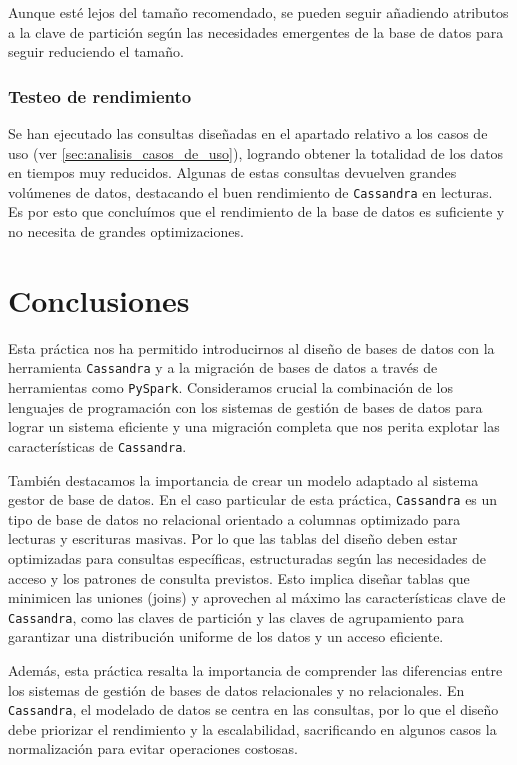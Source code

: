 \documentclass[]{article}
\begin{document}
Aunque esté lejos del tamaño recomendado, se pueden seguir añadiendo atributos
a la clave de partición según las necesidades emergentes de la base de datos
para seguir reduciendo el tamaño.

\subsubsection{Testeo de rendimiento}

Se han ejecutado las consultas diseñadas en el apartado relativo a los casos de
uso (ver \ref{sec:analisis_casos_de_uso}), logrando obtener la totalidad de los
datos en tiempos muy reducidos. Algunas de estas consultas devuelven grandes
volúmenes de datos, destacando el buen rendimiento de \verb!Cassandra! en
lecturas. Es por esto que concluímos que el rendimiento de la base de datos es
suficiente y no necesita de grandes optimizaciones.

\newpage
\section{Conclusiones}

Esta práctica nos ha permitido introducirnos al diseño de bases de datos con la
herramienta \verb!Cassandra! y a la migración de bases de datos a través de
herramientas como \verb!PySpark!. Consideramos crucial la combinación de los
lenguajes de programación con los sistemas de gestión de bases de datos para
lograr un sistema eficiente y una migración completa que nos perita explotar
las características de \verb!Cassandra!.

También destacamos la importancia de crear un modelo adaptado al sistema gestor
de base de datos. En el caso particular de esta práctica, \verb!Cassandra! es
un tipo de base de datos no relacional orientado a columnas optimizado para
lecturas y escrituras masivas. Por lo que las tablas del diseño deben estar
optimizadas para consultas específicas, estructuradas según las necesidades de
acceso y los patrones de consulta previstos. Esto implica diseñar tablas que
minimicen las uniones (joins) y aprovechen al máximo las características clave
de \verb!Cassandra!, como las claves de partición y las claves de agrupamiento
para garantizar una distribución uniforme de los datos y un acceso eficiente.

Además, esta práctica resalta la importancia de comprender las diferencias
entre los sistemas de gestión de bases de datos relacionales y no relacionales.
En \verb!Cassandra!, el modelado de datos se centra en las consultas, por lo
que el diseño debe priorizar el rendimiento y la escalabilidad, sacrificando en
algunos casos la normalización para evitar operaciones costosas.
\end{document}
